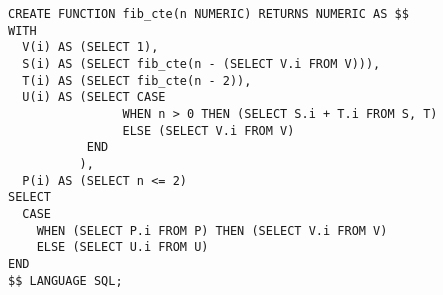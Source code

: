 \begin{verbatim}
CREATE FUNCTION fib_cte(n NUMERIC) RETURNS NUMERIC AS $$
WITH
  V(i) AS (SELECT 1),
  S(i) AS (SELECT fib_cte(n - (SELECT V.i FROM V))),
  T(i) AS (SELECT fib_cte(n - 2)),
  U(i) AS (SELECT CASE
  				WHEN n > 0 THEN (SELECT S.i + T.i FROM S, T)
  				ELSE (SELECT V.i FROM V)
		   END
  		  ),
  P(i) AS (SELECT n <= 2)
SELECT
  CASE
    WHEN (SELECT P.i FROM P) THEN (SELECT V.i FROM V)
    ELSE (SELECT U.i FROM U)
END
$$ LANGUAGE SQL;
\end{verbatim}